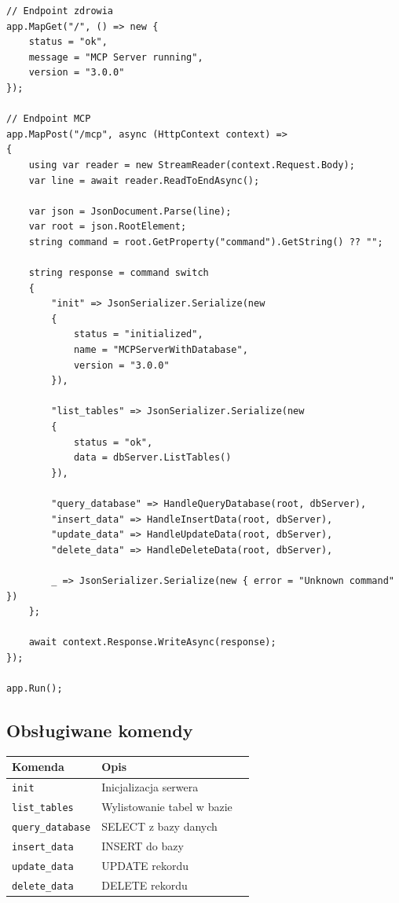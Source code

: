 \documentclass[twoside]{article}
\begin{document}
\begin{lstlisting}
// Endpoint zdrowia
app.MapGet("/", () => new { 
	status = "ok", 
	message = "MCP Server running", 
	version = "3.0.0" 
});

// Endpoint MCP
app.MapPost("/mcp", async (HttpContext context) =>
{
	using var reader = new StreamReader(context.Request.Body);
	var line = await reader.ReadToEndAsync();
	
	var json = JsonDocument.Parse(line);
	var root = json.RootElement;
	string command = root.GetProperty("command").GetString() ?? "";
	
	string response = command switch
	{
		"init" => JsonSerializer.Serialize(new
		{
			status = "initialized",
			name = "MCPServerWithDatabase",
			version = "3.0.0"
		}),
		
		"list_tables" => JsonSerializer.Serialize(new
		{
			status = "ok",
			data = dbServer.ListTables()
		}),
		
		"query_database" => HandleQueryDatabase(root, dbServer),
		"insert_data" => HandleInsertData(root, dbServer),
		"update_data" => HandleUpdateData(root, dbServer),
		"delete_data" => HandleDeleteData(root, dbServer),
		
		_ => JsonSerializer.Serialize(new { error = "Unknown command" })
	};
	
	await context.Response.WriteAsync(response);
});

app.Run();
\end{lstlisting}

\subsection{Obsługiwane komendy}

\begin{table}[H]
	\centering
	\begin{tabular}{|l|p{6cm}|l|}
		\hline
		\textbf{Komenda} & \textbf{Opis} \\
		\hline
		\texttt{init} & Inicjalizacja serwera \\
		\hline
		\texttt{list\_tables} & Wylistowanie tabel w bazie \\
		\hline
		\texttt{query\_database} & SELECT z bazy danych \\
		\hline
		\texttt{insert\_data} & INSERT do bazy \\
		\hline
		\texttt{update\_data} & UPDATE rekordu  \\
		\hline
		\texttt{delete\_data} & DELETE rekordu \\
		\hline
	\end{tabular}
\end{table}
\end{document}
